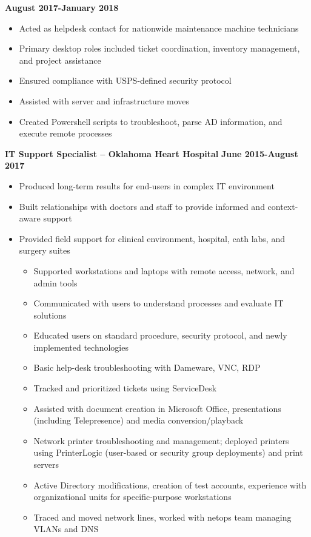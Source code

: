 \documentclass[centered]{res}
\begin{document}
\begin{resume}
\newline
\textbf{August 2017-January 2018}
\begin{itemize}
\item Acted as helpdesk contact for nationwide maintenance machine technicians
\item Primary desktop roles included ticket coordination, inventory management, and project assistance
\item Ensured compliance with USPS-defined security protocol
\item Assisted with server and infrastructure moves
\item Created Powershell scripts to troubleshoot, parse AD information, and execute remote processes
\end{itemize}
\textbf{IT Support Specialist -- Oklahoma Heart Hospital}
\newline
\textbf{June 2015-August 2017}
\begin{itemize}
	\item Produced long-term results for end-users in complex IT environment
	\item Built relationships with doctors and staff to provide informed and context-aware support
	\item Provided field support for clinical environment, hospital, cath labs, and surgery suites
		\begin{itemize}
			\item Supported workstations and laptops with remote access, network, and admin tools
			\item Communicated with users to understand processes and evaluate IT solutions
			\item Educated users on standard procedure, security protocol, and newly implemented technologies
			\item Basic help-desk troubleshooting with Dameware, VNC, RDP
			\item Tracked and prioritized tickets using ServiceDesk
			\item Assisted with document creation in Microsoft Office, presentations (including Telepresence) and media conversion/playback
			\item Network printer troubleshooting and management; deployed printers using PrinterLogic (user-based or security group deployments) and print servers
			\item Active Directory modifications, creation of test accounts, experience with organizational units for specific-purpose workstations
			\item Traced and moved network lines, worked with netops team managing VLANs and DNS

\end{itemize}
\end{itemize}
\end{resume}
\end{document}
